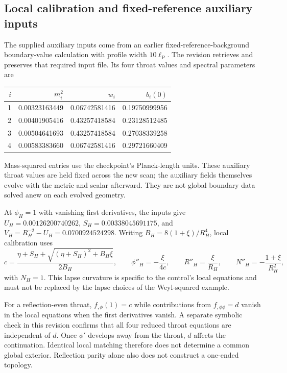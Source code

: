 \documentclass[11pt,oneside]{report}
\newcommand{\lp}{\ell_{\mathrm P}}
\begin{document}
\subsection{Local calibration and fixed-reference auxiliary inputs}
The supplied auxiliary inputs come from an earlier fixed-reference-background boundary-value calculation with profile width $10\lp$. The revision retrieves and preserves that required input file. Its four throat values and spectral parameters are
\begin{center}\begin{tabular}{rrrr}\toprule
$i$ & $m_i^2$ & $w_i$ & $b_i(0)$\\\midrule
1 & 0.00323163449 & 0.06742581416 & 0.19750999956\\
2 & 0.00401905416 & 0.43257418584 & 0.23128512485\\
3 & 0.00504641693 & 0.43257418584 & 0.27038339258\\
4 & 0.00583383660 & 0.06742581416 & 0.29721660409\\\bottomrule
\end{tabular}\end{center}
Mass-squared entries use the checkpoint's Planck-length units. These auxiliary throat values are held fixed across the new scan; the auxiliary fields themselves evolve with the metric and scalar afterward. They are not global boundary data solved anew on each evolved geometry.

At $\phi_H=1$ with vanishing first derivatives, the inputs give $U_H=0.00126200740262$, $S_H=0.00338045691175$, and $V_H=R_H^{-2}-U_H=0.0700924524298$. Writing $B_H=8(1+\xi)/R_H^4$, local calibration uses
\begin{equation}
c=\frac{\eta+S_H+\sqrt{(\eta+S_H)^2+B_H\xi}}{2B_H},\qquad
\phi''_H=-\frac{\xi}{4c},\qquad
R''_H=\frac{\xi}{R_H},\qquad
N''_H=-\frac{1+\xi}{R_H^2},
\end{equation}
with $N_H=1$. This lapse curvature is specific to the control's local equations and must not be replaced by the lapse choices of the Weyl-squared example.

For a reflection-even throat, $f_{,\phi}(1)=c$ while contributions from $f_{,\phi\phi}=d$ vanish in the local equations when the first derivatives vanish. A separate symbolic check in this revision confirms that all four reduced throat equations are independent of $d$. Once $\phi'$ develops away from the throat, $d$ affects the continuation. Identical local matching therefore does not determine a common global exterior. Reflection parity alone also does not construct a one-ended topology.
\end{document}
